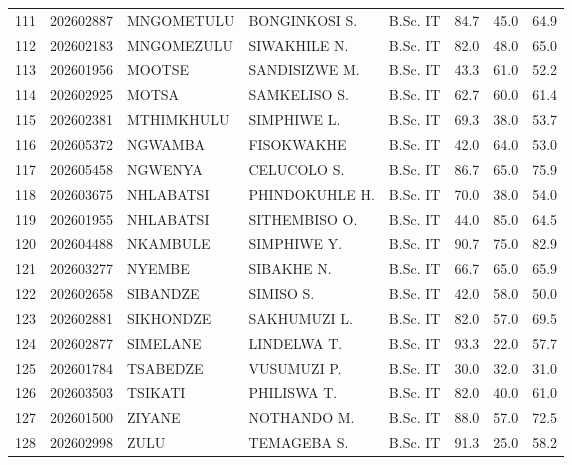 \documentclass[12pt]{article}
\begin{document}
\begin{longtable}{@{}llllllll@{}}
111 & 202602887 & MNGOMETULU & BONGINKOSI S. & B.Sc. IT & 84.7 & 45.0 & 64.9 \\
112 & 202602183 & MNGOMEZULU & SIWAKHILE N. & B.Sc. IT & 82.0 & 48.0 & 65.0 \\
113 & 202601956 & MOOTSE & SANDISIZWE M. & B.Sc. IT & 43.3 & 61.0 & 52.2 \\
114 & 202602925 & MOTSA & SAMKELISO S. & B.Sc. IT & 62.7 & 60.0 & 61.4 \\
115 & 202602381 & MTHIMKHULU & SIMPHIWE L. & B.Sc. IT & 69.3 & 38.0 & 53.7 \\
116 & 202605372 & NGWAMBA & FISOKWAKHE & B.Sc. IT & 42.0 & 64.0 & 53.0 \\
117 & 202605458 & NGWENYA & CELUCOLO S. & B.Sc. IT & 86.7 & 65.0 & 75.9 \\
118 & 202603675 & NHLABATSI & PHINDOKUHLE H. & B.Sc. IT & 70.0 & 38.0 & 54.0 \\
119 & 202601955 & NHLABATSI & SITHEMBISO O. & B.Sc. IT & 44.0 & 85.0 & 64.5 \\
120 & 202604488 & NKAMBULE & SIMPHIWE Y. & B.Sc. IT & 90.7 & 75.0 & 82.9 \\
121 & 202603277 & NYEMBE & SIBAKHE N. & B.Sc. IT & 66.7 & 65.0 & 65.9 \\
122 & 202602658 & SIBANDZE & SIMISO S. & B.Sc. IT & 42.0 & 58.0 & 50.0 \\
123 & 202602881 & SIKHONDZE & SAKHUMUZI L. & B.Sc. IT & 82.0 & 57.0 & 69.5 \\
124 & 202602877 & SIMELANE & LINDELWA T. & B.Sc. IT & 93.3 & 22.0 & 57.7 \\
125 & 202601784 & TSABEDZE & VUSUMUZI P. & B.Sc. IT & 30.0 & 32.0 & 31.0 \\
126 & 202603503 & TSIKATI & PHILISWA T. & B.Sc. IT & 82.0 & 40.0 & 61.0 \\
127 & 202601500 & ZIYANE & NOTHANDO M. & B.Sc. IT & 88.0 & 57.0 & 72.5 \\
128 & 202602998 & ZULU & TEMAGEBA S. & B.Sc. IT & 91.3 & 25.0 & 58.2 \\


\end{longtable}
\end{document}
